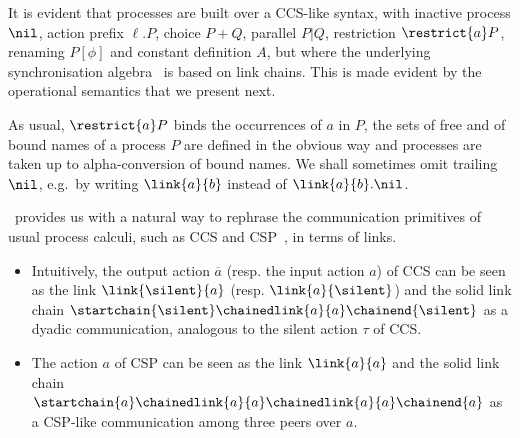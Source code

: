 It is evident that processes are built over a CCS-like syntax,
with inactive process $\nil$, action prefix $\ell.P$, choice $P+Q$, parallel $P|Q$, restriction $\restrict{a} P$, renaming $P[\phi]$ and constant definition
 $A$, but where the underlying synchronisation algebra~\cite{DBLP:journals/tcs/Winskel84} is based on link chains.
This is made evident by the operational semantics that we present next.

As usual, $\restrict{a}P$ binds the occurrences of $a$ in $P$, the sets of free and of bound names of a process $P$ are defined in the obvious way and 
processes are taken up to alpha-conversion of bound names.
We shall sometimes omit trailing $\nil$, e.g.~by writing $\link{a}{b}$ instead of $\link{a}{b}.\nil$.


\begin{example}
\CNA\ provides us with a natural way to rephrase the communication primitives of usual process calculi, such as CCS and CSP~\cite{Hoare85}, in terms of links.
\begin{itemize}
\item
Intuitively, the output action $\overline{a}$ (resp. the input action $a$) of CCS can be seen as the link $\link{\silent}{a}$
(resp. $\link{a}{\silent}$) and the solid link chain $\startchain{\silent}\chainedlink{a}{a}\chainend{\silent}$  as a dyadic communication, analogous to the silent action $\tau$ of CCS.
\item
The action $a$ of CSP can be seen as the link $\link{a}{a}$ and the solid link chain $\startchain{a}\chainedlink{a}{a}\chainedlink{a}{a}\chainend{a}$ as a CSP-like communication among three peers over $a$.
\end{itemize}
\end{example}




